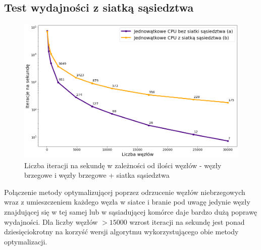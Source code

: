 \documentclass[12pt, letterpaper]{report}
\begin{document}
    \subsection{Test wydajności z siatką sąsiedztwa}
    \begin{figure}[H]
        \centering
        \includegraphics[width=18cm]{performance_cpu_grid_nogrid.png}
        \caption{
            Liczba iteracji na sekundę w zależności od ilości węzłów -
            węzły brzegowe i węzły brzegowe + siatka sąsiedztwa
        }
    \end{figure}
    Połączenie metody optymalizującej poprzez odrzucenie węzłów niebrzegowych wraz z umieszczeniem każdego węzła
    w siatce i branie pod uwagę jedynie węzły znajdującej się w tej samej lub w sąsiadującej komórce daje 
    bardzo dużą poprawę wydajności. Dla liczby węzłów $>15000$ wzrost iteracji na sekundę jest ponad 
    dziesięciokrotny na korzyść wersji algorytmu wykorzystującego obie metody optymalizacji.

\end{document}
